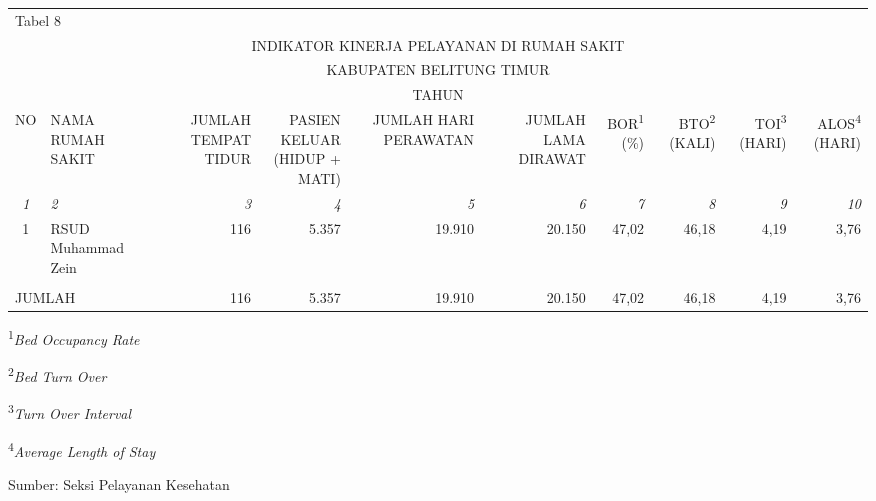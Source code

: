 {}

{\centering %
\begin{tabular}{clrrrrrrrr}
	\multicolumn{10}{l}{Tabel 8}\\
	\multicolumn{10}{c}{INDIKATOR KINERJA PELAYANAN DI RUMAH SAKIT}\\
	\multicolumn{10}{c}{KABUPATEN BELITUNG TIMUR}\\
	\multicolumn{10}{c}{TAHUN \tP}\\
	\toprule
	\multicolumn{1}{c}{NO} & \multicolumn{1}{l}{NAMA RUMAH SAKIT} & \multicolumn{1}{r}{\parbox{2.5cm}{\raggedleft JUMLAH TEMPAT TIDUR}} & \multicolumn{1}{r}{\parbox{2.5cm}{\raggedleft PASIEN KELUAR \\(HIDUP + MATI)}} & \multicolumn{1}{r}{\parbox{3cm}{\raggedleft JUMLAH HARI PERAWATAN}} & \multicolumn{1}{r}{\parbox{3cm}{\raggedleft JUMLAH LAMA DIRAWAT}} & \multicolumn{1}{r}{BOR\textsuperscript{1} (\%)} & \multicolumn{1}{r}{BTO\textsuperscript{2} (KALI)} & \multicolumn{1}{r}{TOI\textsuperscript{3} (HARI)} & \multicolumn{1}{r}{ALOS\textsuperscript{4} (HARI)} \\
	\midrule
	\emph{1} & \emph{2} & \emph{3} & \emph{4} & \emph{5} & \emph{6} & \emph{7} & \emph{8} & \emph{9} & \emph{10}\\
	\midrule
	1 & RSUD Muhammad Zein     & 116 & 5.357 & 19.910 & 20.150 & 47,02 & 46,18 & 4,19  & 3,76 \\
	& & & & & & & & &  \\
	\midrule
	\multicolumn{2}{l}{JUMLAH} & 116 & 5.357 & 19.910 & 20.150 & 47,02 & 46,18 & 4,19  & 3,76 \\
	\bottomrule
\end{tabular}%

}

\vspace{2ex}
{\small
\textsuperscript{1}\emph{Bed Occupancy Rate}

\textsuperscript{2}\emph{Bed Turn Over}

\textsuperscript{3}\emph{Turn Over Interval}

\textsuperscript{4}\emph{Average Length of Stay}

}

\vfill
Sumber: Seksi Pelayanan Kesehatan\par